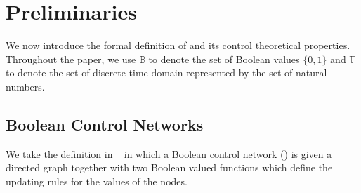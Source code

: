 
\section{Preliminaries} 
\label{sec:pre}
We now introduce the formal definition of {\BCNs} and its control theoretical properties. Throughout the paper, we use $\mathbb{B}$ to denote the set of Boolean values $\{0,1\}$ and $\mathbb{T}$ to denote the set of discrete time domain represented by the set of  natural numbers.

\subsection{Boolean Control Networks}

We take the definition in ~\cite{Ideker2001A} in which a Boolean control network (\BCN)  is given a directed graph together with two  Boolean valued functions which define the updating rules for the  values of the nodes. 

